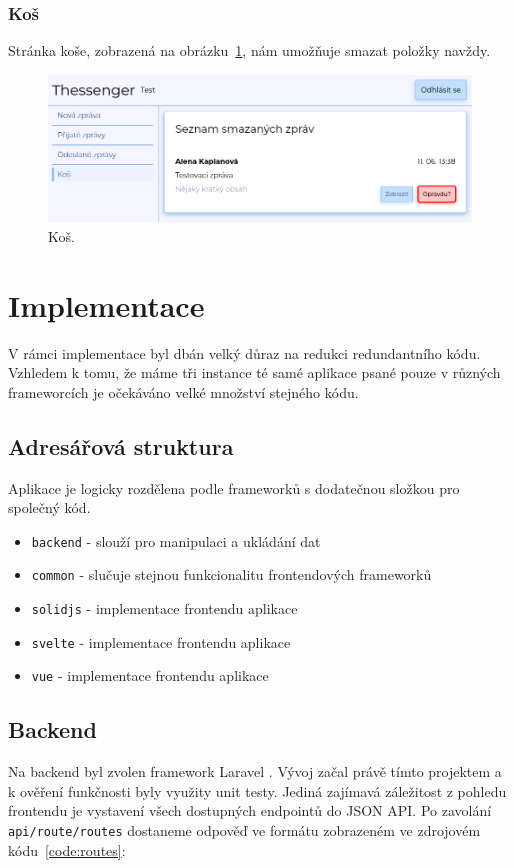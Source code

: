 \documentclass[
  master,
  program=ainf,
  tables=false,
  sourcecodes,
  glossaries,
  index
]{kidiplom}
\begin{document}
\subsubsection{Koš}
Stránka koše, zobrazená na obrázku~\ref{fig:bin}, nám umožňuje smazat položky navždy.

\begin{figure}[H]
  \centering
  \includegraphics[width=\textwidth]{graphics/thessenger_bin.png}
  \caption{Koš.}
  \label{fig:bin}
\end{figure}

\newpage
\section{Implementace}
V rámci implementace byl dbán velký důraz na redukci redundantního kódu.
Vzhledem k tomu, že máme tři instance té samé aplikace psané pouze v různých
frameworcích je očekáváno velké množství stejného kódu.

\subsection{Adresářová struktura}
Aplikace je logicky rozdělena podle frameworků s dodatečnou složkou pro společný kód.
\begin{itemize}
  \item {\tt backend} - slouží pro manipulaci a ukládání dat
  \item {\tt common} - slučuje stejnou funkcionalitu frontendových frameworků
  \item {\tt solidjs} - implementace frontendu aplikace
  \item {\tt svelte} - implementace frontendu aplikace
  \item {\tt vue} - implementace frontendu aplikace
\end{itemize}

\subsection{Backend}
Na backend byl zvolen framework Laravel \cite{laravel}. Vývoj začal právě tímto projektem a k
ověření funkčnosti byly využity unit testy. Jediná zajímavá záležitost z
pohledu frontendu je vystavení všech dostupných endpointů do JSON API. Po
zavolání {\tt api/route/routes} dostaneme odpověď ve formátu zobrazeném ve zdrojovém kódu~\ref{code:routes}:
\end{document}

